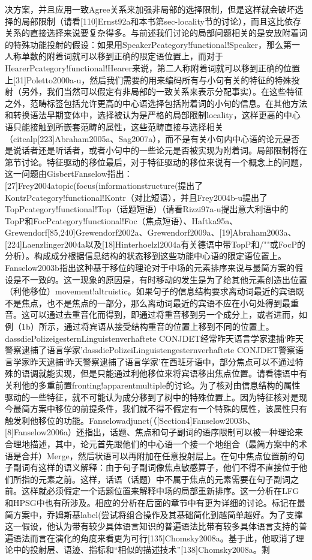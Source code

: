 决方案，并且应用一致Agree关系来加强非局部的选择限制，但是这样就会破坏选择的局部限制（请看[110]Ernst92a和本书第sec-locality节的讨论），而且这比依存关系的直接选择来说要复杂得多。与前述我们讨论的局部问题相关的是安放附着词的特殊功能投射的假设：如果用SpeakerPcategory!functional!Speaker，那么第一人称单数的附着词就可以移到正确的限定语位置上，而对于HearerPcategory!functional!Hearer来说，第二人称附着词就可以移到正确的位置上[31]Poletto2000a-u，然后我们需要的用来编码所有与小句有关的特征的特殊投射（另外，我们当然可以假定有非局部的一致关系来表示分配事实）。在这些特征之外，范畴标签包括允许更高的中心语选择包括附着词的小句的信息。在其他方法和转换语法早期变体中，选择被认为是严格的局部限制locality，这样更高的中心语只能接触到所嵌套范畴的属性，这些范畴直接与选择相关（citealp[223]Abraham2005a、Sag2007a），而不是有关小句内中心语的论元是否是说话者还是听话者，或者小句中的一些论元是否被实现为附着词。局部限制将在第节讨论。特征驱动的移位最后，对于特征驱动的移位来说有一个概念上的问题，这一问题由GisbertFanselow指出：[27]Frey2004atopic(focus(informationstructure(提出了KontrPcategory!functional!Kontr（对比短语），并且Frey2004b-u提出了TopPcategory!functional!Top（话题短语）（请看Rizzi97a-u提出意大利语中的TopP和FocPcategory!functional!Foc（焦点短语）、Haftka95a、Grewendorf[85,240]Grewendorf2002a、Grewendorf2009a、[19]Abraham2003a、[224]Laenzlinger2004a以及[18]Hinterhoelzl2004a有关德语中带TopP和/""或FocP的分析）。构成成分根据信息结构的状态移到这些功能中心语的限定语位置上。Fanselow2003b指出这种基于移位的理论对于中场的元素排序来说与最简方案的假设是不一致的。这一现象的原因是，有时移动的发生是为了给其他元素创造出位置（利他移位）movement!altruistic。如果句子的信息结构要求离动词最近的宾语既不是焦点，也不是焦点的一部分，那么离动词最近的宾语不应在小句处得到最重音。这可以通过去重音化而得到，即通过将重音移到另一个成分上，或者进而，如例（1b）所示，通过将宾语从接受结构重音的位置上移到不同的位置上。dassdiePolizeigesternLinguistenverhaftete	CONJDET经常昨天语言学家逮捕`昨天警察逮捕了语言学家'dassdiePolizeiLinguistengesternverhaftete	CONJDET警察语言学家昨天逮捕`昨天警察逮捕了语言学家'在西班牙语中，部分焦点可以不通过特殊的语调就能实现，但是只能通过利他移位来将宾语移出焦点位置。请看德语中有关利他的多重前置fronting!apparentmultiple的讨论。为了核对由信息结构的属性驱动的一些特征，就不可能认为成分移到了树中的特殊位置上。因为特征核对是现今最简方案中移位的前提条件，我们就不得不假定有一个特殊的属性，该属性只有触发利他移位的功能。Fanselowadjunct(（[Section4]Fanselow2003b、[8]Fanselow2006a）还指出，话题、焦点和句子副词的语序限制可以被一种理论来合理地描述，其中，论元首先跟他们的中心语一个接一个地组合（最简方案中的术语是合并）Merge，然后状语可以再附加在任意投射层上。在句中焦点位置前的句子副词有这样的语义解释：由于句子副词像焦点敏感算子，他们不得不直接位于他们所指的元素之前。这样，话语（话题）中不属于焦点的元素需要在句子副词之前。这样就必须假定一个话题位置来解释中场的局部重新排序。这一分析在LFG和HPSG中也有所涉及。相应的分析在后面的章节中有更为详细的讨论。标记在最简方案中，乔姆斯基label(尝试将组合操作及其基础简化到越简单越好。为了支撑这一假设，他认为带有较少具体语言知识的普遍语法比带有较多具体语言支持的普遍语法而言在演化的角度来看更为可行[135]Chomsky2008a。基于此，他取消了理论中的投射层、语迹、指标和“相似的描述技术”[138]Chomsky2008a。剩